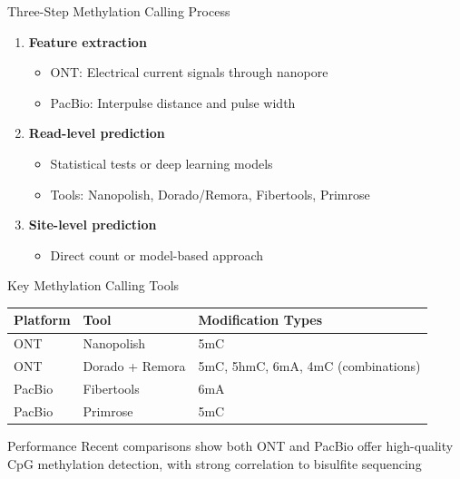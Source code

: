 \documentclass[aspectratio=169]{beamer}
\begin{document}
\begin{frame}{Three-Step Methylation Calling Process}
  \begin{enumerate}
    \item \textbf{Feature extraction}
    \begin{itemize}
      \item ONT: Electrical current signals through nanopore
      \item PacBio: Interpulse distance and pulse width
    \end{itemize}

    \item \textbf{Read-level prediction}
    \begin{itemize}
      \item Statistical tests or deep learning models
      \item Tools: Nanopolish, Dorado/Remora, Fibertools, Primrose
    \end{itemize}

    \item \textbf{Site-level prediction}
    \begin{itemize}
      \item Direct count or model-based approach
    \end{itemize}
  \end{enumerate}
\end{frame}

\begin{frame}{Key Methylation Calling Tools}
  \begin{table}
    \small
    \begin{tabular}{|l|l|l|}
      \hline
      \rowcolor{conesaLightGray}
      \textbf{Platform} & \textbf{Tool} & \textbf{Modification Types} \\
      \hline
      ONT & Nanopolish & 5mC \\
      \hline
      ONT & Dorado + Remora & 5mC, 5hmC, 6mA, 4mC (combinations) \\
      \hline
      PacBio & Fibertools & 6mA \\
      \hline
      PacBio & Primrose & 5mC \\
      \hline
    \end{tabular}
  \end{table}

  \vspace{0.3cm}

  \begin{block}{Performance}
    Recent comparisons show both ONT and PacBio offer high-quality CpG methylation detection, with strong correlation to bisulfite sequencing
  \end{block}
\end{frame}
\end{document}
